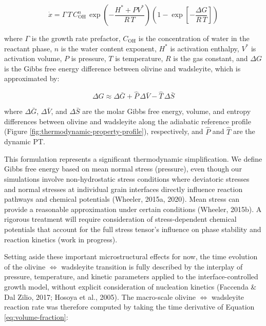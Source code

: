 \documentclass[draft,linenumbers]{agujournal2019}
\begin{document}
\begin{equation}
  \dot{x} = \Gamma\, T\, C_\mathrm{OH}^n\, \exp\!\left(-\frac{H^{\ast} + P V^{\ast}}{R\, T}\right) \left(1 - \exp\!\left[-\frac{\Delta G}{R\, T}\right] \right)
  \label{eq:growth-rate}
\end{equation}

where \(\Gamma\) is the growth rate prefactor, \(C_\mathrm{OH}\) is the
concentration of water in the reactant phase, \(n\) is the water content
exponent, \(H^{\ast}\) is activation enthalpy, \(V^{\ast}\) is
activation volume, \(P\) is pressure, \(T\) is temperature, \(R\) is the
gas constant, and \(\Delta G\) is the Gibbs free energy difference
between olivine and wadsleyite, which is approximated by:

\begin{equation}
  \Delta G \approx \Delta \bar{G} + \hat{P}\, \Delta \bar{V} - \hat{T}\, \Delta \bar{S}
  \label{eq:gibbs}
\end{equation}

where \(\Delta \bar{G}\), \(\Delta \bar{V}\), and \(\Delta \bar{S}\) are
the molar Gibbs free energy, volume, and entropy differences between
olivine and wadsleyite along the adiabatic reference profile (Figure
\ref{fig:thermodynamic-property-profile}), respectively, and \(\hat{P}\)
and \(\hat{T}\) are the dynamic PT.

This formulation represents a significant thermodynamic simplification.
We define Gibbs free energy based on mean normal stress (pressure), even
though our simulations involve non-hydrostatic stress conditions where
deviatoric stresses and normal stresses at individual grain interfaces
directly influence reaction pathways and chemical potentials (Wheeler,
2015a, 2020). Mean stress can provide a reasonable approximation under
certain conditions (Wheeler, 2015b). A rigorous treatment will require
consideration of stress-dependent chemical potentials that account for
the full stress tensor's influence on phase stability and reaction
kinetics (work in progress).

Setting aside these important microstructural effects for now, the time
evolution of the olivine \(\Leftrightarrow\) wadsleyite transition is
fully described by the interplay of pressure, temperature, and kinetic
parameters applied to the interface-controlled growth model, without
explicit consideration of nucleation kinetics (Faccenda \& Dal Zilio,
2017; Hosoya et al., 2005). The macro-scale olivine \(\Leftrightarrow\)
wadsleyite reaction rate was therefore computed by taking the time
derivative of Equation \ref{eq:volume-fraction}:
\end{document}
